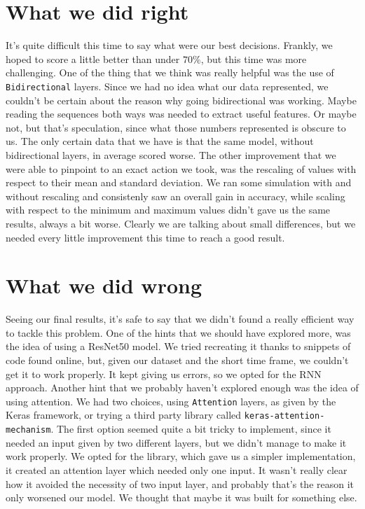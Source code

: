 \documentclass[a4paper,11pt]{article}
\newcommand{\code}[1]{\texttt{#1}}
\numberwithin{equation}{section}
\begin{document}
\section*{What we did right}
It's quite difficult this time to say what were our best decisions. Frankly, we hoped to score a little better than under \(70\%\), but this time was more challenging. One of the thing that we think was really helpful was the use of \code{Bidirectional} layers. Since we had no idea what our data represented, we couldn't be certain about the reason why going bidirectional was working. Maybe reading the sequences both ways was needed to extract useful features. Or maybe not, but that's speculation, since what those numbers represented is obscure to us. The only certain data that we have is that the same model, without bidirectional layers, in average scored worse. The other improvement that we were able to pinpoint to an exact action we took, was the rescaling of values with respect to their mean and standard deviation. We ran some simulation with and without rescaling and consistenly saw an overall gain in accuracy, while scaling with respect to the minimum and maximum values didn't gave us the same results, always a bit worse. Clearly we are talking about small differences, but we needed every little improvement this time to reach a good result.
\section*{What we did wrong}
Seeing our final results, it's safe to say that we didn't found a really efficient way to tackle this problem. One of the hints that we should have explored more, was the idea of using a ResNet50 model. We tried recreating it thanks to snippets of code found online, but, given our dataset and the short time frame, we couldn't get it to work properly. It kept giving us errors, so we opted for the RNN approach. Another hint that we probably haven't explored enough was the idea of using attention. We had two choices, using \code{Attention} layers, as given by the Keras framework, or trying a third party library called \code{keras-attention-mechanism}. The first option seemed quite a bit tricky to implement, since it needed an input given by two different layers, but we didn't manage to make it work properly. We opted for the library, which gave us a simpler implementation, it created an attention layer which needed only one input. It wasn't really clear how it avoided the necessity of two input layer, and probably that's the reason it only worsened our model. We thought that maybe it was built for something else.
\end{document}
